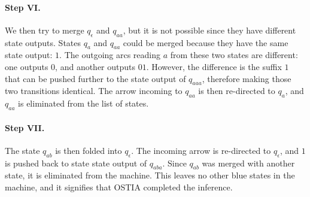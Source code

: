 \paragraph{Step VI.}

We then try to merge $q_\epsilon$ and $q_{aa}$, but it is not possible since they have different state outputs.
States $q_{a}$ and $q_{aa}$ could be merged because they have the same state output: $1$.
The outgoing arcs reading $a$ from these two states are different: one outputs $0$, and another outputs $01$.
However, the difference is the suffix $1$ that can be pushed further to the state output of $q_{aaa}$, therefore making those two transitions identical.
The arrow incoming to $q_{aa}$ is then re-directed to $q_{a}$, and $q_{aa}$ is eliminated from the list of states.

\begin{center}
\end{center}


\paragraph{Step VII.}

The state $q_{ab}$ is then folded into $q_{\epsilon}$.
The incoming arrow is re-directed to $q_{\epsilon}$, and $1$ is pushed back to state state output of $q_{aba}$.
Since $q_{ab}$ was merged with another state, it is eliminated from the machine.
This leaves no other blue states in the machine, and it signifies that OSTIA completed the inference.

\begin{center}
\end{center}

